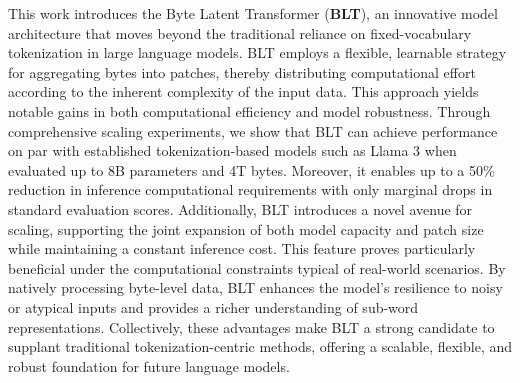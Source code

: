 This work introduces the Byte Latent Transformer (\textbf{BLT}), an innovative model architecture that moves beyond the traditional reliance on fixed-vocabulary tokenization in large language models. {\textsc BLT} employs a flexible, learnable strategy for aggregating bytes into patches, thereby distributing computational effort according to the inherent complexity of the input data. This approach yields notable gains in both computational efficiency and model robustness. Through comprehensive scaling experiments, we show that {\textsc BLT} can achieve performance on par with established tokenization-based models such as Llama 3 when evaluated up to 8B parameters and 4T bytes. Moreover, it enables up to a 50\% reduction in inference computational requirements with only marginal drops in standard evaluation scores. Additionally, {\textsc BLT} introduces a novel avenue for scaling, supporting the joint expansion of both model capacity and patch size while maintaining a constant inference cost. This feature proves particularly beneficial under the computational constraints typical of real-world scenarios. By natively processing byte-level data, {\textsc BLT} enhances the model’s resilience to noisy or atypical inputs and provides a richer understanding of sub-word representations. Collectively, these advantages make {\textsc BLT} a strong candidate to supplant traditional tokenization-centric methods, offering a scalable, flexible, and robust foundation for future language models.

